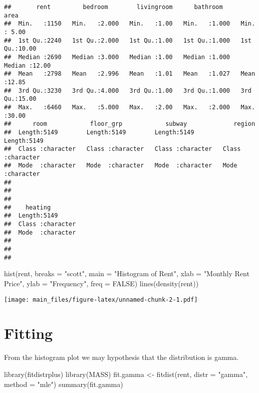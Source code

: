 \documentclass[
]{article}
\newenvironment{Shaded}{\begin{snugshade}}{\end{snugshade}}
\newcommand{\AttributeTok}[1]{\textcolor[rgb]{0.77,0.63,0.00}{#1}}
\newcommand{\ConstantTok}[1]{\textcolor[rgb]{0.00,0.00,0.00}{#1}}
\newcommand{\FunctionTok}[1]{\textcolor[rgb]{0.00,0.00,0.00}{#1}}
\newcommand{\NormalTok}[1]{#1}
\newcommand{\OtherTok}[1]{\textcolor[rgb]{0.56,0.35,0.01}{#1}}
\newcommand{\StringTok}[1]{\textcolor[rgb]{0.31,0.60,0.02}{#1}}
\begin{document}
\begin{verbatim}
##       rent         bedroom        livingroom      bathroom          area      
##  Min.   :1150   Min.   :2.000   Min.   :1.00   Min.   :1.000   Min.   : 5.00  
##  1st Qu.:2240   1st Qu.:2.000   1st Qu.:1.00   1st Qu.:1.000   1st Qu.:10.00  
##  Median :2690   Median :3.000   Median :1.00   Median :1.000   Median :12.00  
##  Mean   :2798   Mean   :2.996   Mean   :1.01   Mean   :1.027   Mean   :12.85  
##  3rd Qu.:3230   3rd Qu.:4.000   3rd Qu.:1.00   3rd Qu.:1.000   3rd Qu.:15.00  
##  Max.   :6460   Max.   :5.000   Max.   :2.00   Max.   :2.000   Max.   :30.00  
##      room            floor_grp            subway             region         
##  Length:5149        Length:5149        Length:5149        Length:5149       
##  Class :character   Class :character   Class :character   Class :character  
##  Mode  :character   Mode  :character   Mode  :character   Mode  :character  
##                                                                             
##                                                                             
##                                                                             
##    heating         
##  Length:5149       
##  Class :character  
##  Mode  :character  
##                    
##                    
## 
\end{verbatim}

\begin{Shaded}
\begin{Highlighting}[]
\FunctionTok{hist}\NormalTok{(rent, }\AttributeTok{breaks =} \StringTok{"scott"}\NormalTok{, }\AttributeTok{main =} \StringTok{"Histogram of Rent"}\NormalTok{, }\AttributeTok{xlab =} \StringTok{"Monthly Rent Price"}\NormalTok{, }\AttributeTok{ylab =} \StringTok{"Frequency"}\NormalTok{, }\AttributeTok{freq =} \ConstantTok{FALSE}\NormalTok{)}
\FunctionTok{lines}\NormalTok{(}\FunctionTok{density}\NormalTok{(rent))}
\end{Highlighting}
\end{Shaded}

\texttt{[image: main\_files/figure-latex/unnamed-chunk-2-1.pdf]}

\hypertarget{fitting}{%
\section{Fitting}\label{fitting}}

From the histogram plot we may hypothesis that the distribution is
gamma.

\begin{Shaded}
\begin{Highlighting}[]
\FunctionTok{library}\NormalTok{(fitdistrplus)}
\FunctionTok{library}\NormalTok{(MASS)}
\NormalTok{fit.gamma }\OtherTok{\textless{}{-}} \FunctionTok{fitdist}\NormalTok{(rent, }\AttributeTok{distr =} \StringTok{"gamma"}\NormalTok{, }\AttributeTok{method =} \StringTok{"mle"}\NormalTok{)}
\FunctionTok{summary}\NormalTok{(fit.gamma)}
\end{Highlighting}
\end{Shaded}
\end{document}
